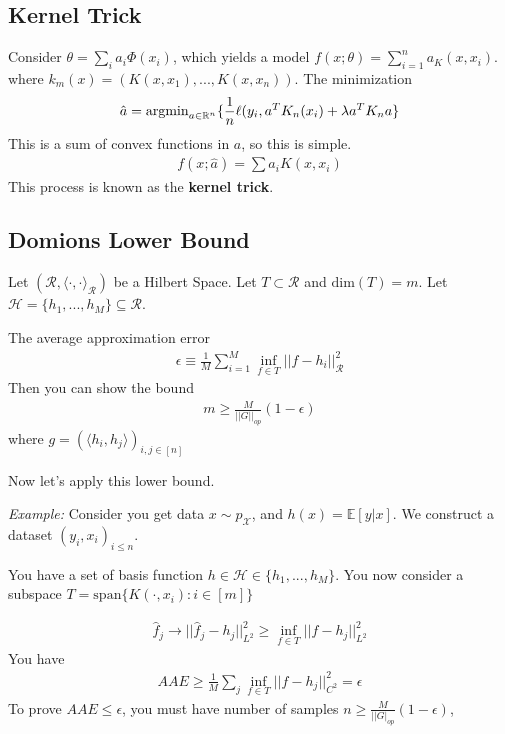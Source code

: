 \subsection{Kernel Trick}
Consider $\theta = \sum_i a_i \Phi(x_i)$, which yields a model $f(x; \theta) = \sum_{i=1}^n a_ K(x, x_i)$. where $k_m(x) = (K(x, x_1), ..., K(x, x_n))$. The  minimization
\begin{align}
	\hat a = \operatorname{argmin}_{a \in \mathbb R^n} \{ \frac{1}{n} \ell(y_i, a^T K_n(x_i) + \lambda a^T K_n a\}
\end{align}
This is a sum of convex functions in $a$, so this is simple.
\begin{align}
	f(x; \hat a) = \sum a_i K(x, x_i)
\end{align}
This process is known as the \textbf{kernel trick}.

\subsection{Domions Lower Bound}
\begin{theorem}
	Let $(\mathcal R, \langle \cdot, \cdot \rangle_{\mathcal R})$ be a Hilbert Space. Let $T \subset \mathcal R$ and $\text{dim}(T) = m$. Let $\mathcal H = \{h_1,..., h_M\} \subseteq \mathcal R$.
	
	The average approximation error
	\begin{align}
		\epsilon \equiv \frac{1}{M} \sum_{i=1}^M \inf_{f\in T} ||f - h_i||^2_{\mathcal R}
	\end{align}
	Then you can show the bound
	\begin{align}
		m \geq \frac{M}{||G||_{op}} (1-\epsilon)
	\end{align}
	where $g = (\langle h_i, h_j\rangle)_{i,j \in [n]}$
\end{theorem}
Now let's apply this lower bound.

\begin{sidework}
	\emph{Example:} Consider you get data $x \sim p_{\mathcal X}$, and $h(x) = \mathbb E[y | x]$. We construct a dataset $(y_i, x_i)_{i \leq n}$.
	
	You have a set of basis function $h \in \mathcal H \in \{h_1,..., h_M\}$. You now consider a subspace $T = \text{span} \{ K(\cdot, x_i) : i \in [m] \}$
	
	\begin{align}
		\hat f_j \to || \hat f_j - h_j ||^2 _{L^2} \geq \inf_{f \in T} || f - h_j ||^2_{L^2}
	\end{align}
	You have 
	\begin{align}
		AAE \geq \frac{1}{M} \sum_j \inf_{f\in T} ||f - h_j||^2_{C^2} = \epsilon
	\end{align}
	To prove ${AAE} \leq \epsilon$, you must have number of samples $n\geq \frac{M}{||G|_{op}}(1-\epsilon)$, 
\end{sidework}

